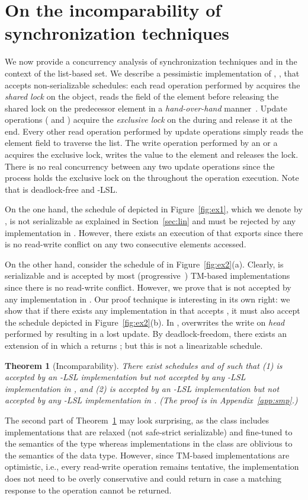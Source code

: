 \documentclass[11pt,pdftex,letterpaper]{article}
\newtheorem{theorem}{Theorem}
\begin{document}
\section{On the incomparability of synchronization techniques}\label{sec:incomparability}
We now provide a concurrency analysis of synchronization techniques  and 
in the context of the list-based set.
We describe a pessimistic implementation of , ,
that accepts non-serializable schedules: each read operation performed by  
acquires the \emph{shared lock} on the object, 
reads the  field of the element before releasing the shared lock on the predecessor element 
in a \emph{hand-over-hand} manner~\cite{BS88}.
Update operations ( and
) acquire the \emph{exclusive lock} on the  during  
and release it at the end. Every other read operation performed 
by update operations simply reads the element  field to traverse the list. The write operation
performed by an  or a  acquires the exclusive lock, writes the value
to the element and releases the lock.
There is no real concurrency between any two update operations since the process holds the 
exclusive lock on the  throughout the operation execution.
Note that  is deadlock-free and -LSL.

On the one hand, the schedule of  depicted in Figure~\ref{fig:ex1}, which we denote by , is not serializable
as explained in Section~\ref{sec:lin}
and must be rejected by any implementation in .
However, there exists an execution of  that exports 
since there is no read-write conflict on any two consecutive elements accessed.

On the other hand, consider the schedule  of  in Figure~\ref{fig:ex2}(a).
Clearly,  is serializable and is accepted by most (progressive~\cite{tm-theory}) TM-based implementations since there
is no read-write conflict.
However, we prove that  is not accepted by any implementation in .
Our proof technique is interesting in its own right: we show that
if there exists any implementation in  that accepts , it must also
accept the schedule  depicted in Figure~\ref{fig:ex2}(b). In , 
 overwrites the write on \emph{head} performed by 
resulting in a lost update. By deadlock-freedom, there exists an extension of  in which
a  returns ; but this is not a linearizable schedule. 
\begin{theorem}[Incomparability]
\label{th:mpl}
There exist schedules  and  
of  such that
(1)  is accepted by an -LSL implementation 
but not accepted by \emph{any} -LSL implementation in , and
(2)  is accepted by an -LSL implementation 
but not accepted by \emph{any} -LSL implementation in
.
(The proof is in Appendix~\ref{app:smp}.)
\end{theorem}
The second part of
Theorem~\ref{th:mpl} 
may look surprising, as 
the class  includes implementations that are relaxed (not safe-strict serializable) and 
fine-tuned to the semantics of the type whereas implementations in the class  are oblivious to the semantics of the data type.
However, since TM-based implementations are optimistic, i.e., every read-write operation remains tentative, 
the implementation does not need to be overly conservative and could return  in case a matching response to the 
operation cannot be returned.
\end{document}
